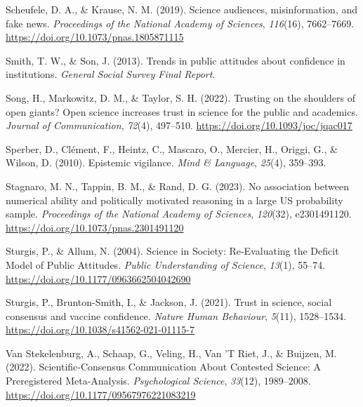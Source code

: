 \documentclass[
  jou,
  floatsintext,
  longtable,
  nolmodern,
  notxfonts,
  notimes,
  colorlinks=true,linkcolor=blue,citecolor=blue,urlcolor=blue]{apa7}
\newlength{\cslhangindent}
\newenvironment{CSLReferences}[2] %
 {\begin{list}{}{%
  \setlength{\itemindent}{0pt}
  \setlength{\leftmargin}{0pt}
  \setlength{\parsep}{0pt}
  \ifodd #1
   \setlength{\leftmargin}{\cslhangindent}
   \setlength{\itemindent}{-1\cslhangindent}
  \fi
  \setlength{\itemsep}{#2\baselineskip}}}
 {\end{list}}
\begin{document}
\begin{CSLReferences}{1}{0}
Scheufele, D. A., \& Krause, N. M. (2019). Science audiences,
misinformation, and fake news. \emph{Proceedings of the National Academy
of Sciences}, \emph{116}(16), 7662--7669.
\url{https://doi.org/10.1073/pnas.1805871115}

Smith, T. W., \& Son, J. (2013). Trends in public attitudes about
confidence in institutions. \emph{General Social Survey Final Report}.

Song, H., Markowitz, D. M., \& Taylor, S. H. (2022). Trusting on the
shoulders of open giants? Open science increases trust in science for
the public and academics. \emph{Journal of Communication}, \emph{72}(4),
497--510. \url{https://doi.org/10.1093/joc/jqac017}

Sperber, D., Clément, F., Heintz, C., Mascaro, O., Mercier, H., Origgi,
G., \& Wilson, D. (2010). Epistemic vigilance. \emph{Mind \& Language},
\emph{25}(4), 359--393.

Stagnaro, M. N., Tappin, B. M., \& Rand, D. G. (2023). No association
between numerical ability and politically motivated reasoning in a large
US probability sample. \emph{Proceedings of the National Academy of
Sciences}, \emph{120}(32), e2301491120.
\url{https://doi.org/10.1073/pnas.2301491120}

Sturgis, P., \& Allum, N. (2004). Science in Society: Re-Evaluating the
Deficit Model of Public Attitudes. \emph{Public Understanding of
Science}, \emph{13}(1), 55--74.
\url{https://doi.org/10.1177/0963662504042690}

Sturgis, P., Brunton-Smith, I., \& Jackson, J. (2021). Trust in science,
social consensus and vaccine confidence. \emph{Nature Human Behaviour},
\emph{5}(11), 1528--1534.
\url{https://doi.org/10.1038/s41562-021-01115-7}

Van Stekelenburg, A., Schaap, G., Veling, H., Van 'T Riet, J., \&
Buijzen, M. (2022). Scientific-Consensus Communication About Contested
Science: A Preregistered Meta-Analysis. \emph{Psychological Science},
\emph{33}(12), 1989--2008.
\url{https://doi.org/10.1177/09567976221083219}


\end{CSLReferences}
\end{document}
